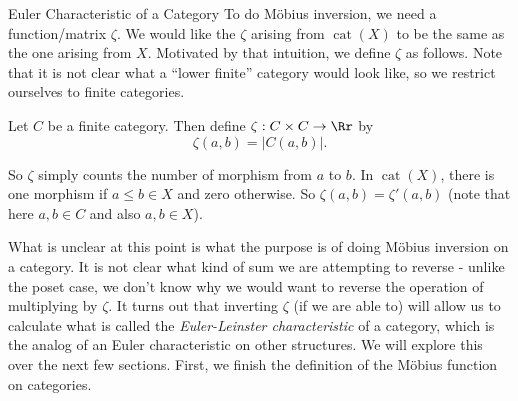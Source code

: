 \documentclass[12pt]{pom_thesis}
\DeclareMathOperator{\cat}{cat}
\begin{document}
\begin{chapter}{Euler Characteristic of a Category}
To do M\"obius inversion, we need a function/matrix $\zeta$. We would like the $\zeta$ arising from $\cat(X)$ to be the same as the one arising from $X$. Motivated by that intuition, we define $\zeta$ as follows. Note that it is not clear what a ``lower finite'' category would look like, so we restrict ourselves to finite categories.

\begin{defn}
Let $C$ be a finite category. Then define $\zeta : C \times C \rightarrow \Rr$ by 
\[
\zeta(a,b) = |C(a,b)|.
\]
\end{defn}
So $\zeta$ simply counts the number of morphism from $a$ to $b$. In $\cat(X)$, there is one morphism if $a \leq b \in X$ and zero otherwise. So $\zeta(a,b) = \zeta'(a,b)$ (note that here $a,b \in C$ and also $a,b \in X$).

What is unclear at this point is what the purpose is of doing M\"obius inversion on a category. It is not clear what kind of sum we are attempting to reverse - unlike the poset case, we don't know why we would want to reverse the operation of multiplying by $\zeta$. It turns out that inverting $\zeta$ (if we are able to) will allow us to calculate what is called the \emph{Euler-Leinster characteristic} of a category, which is the analog of an Euler characteristic on other structures. We will explore this over the next few sections. First, we finish the definition of the M\"obius function on categories.


\end{chapter}
\end{document}
